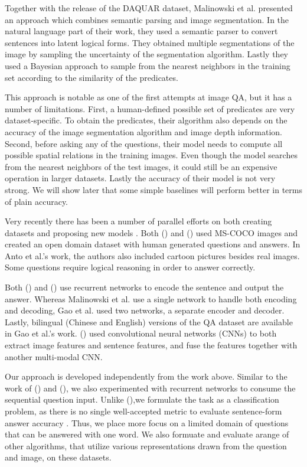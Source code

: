 \documentclass{article}
\renewcommand{\*}[1]{\textbf{#1}}
\newcommand{\shortcite}[1]{\citeauthor{#1} (\citeyear{#1})}
\begin{document}
Together with the release of the DAQUAR dataset, Malinowski et al. presented 
an approach which combines semantic parsing and image segmentation. In the 
natural language part of their work, they used a semantic parser \cite{liang13} 
to convert sentences into latent logical forms. They obtained multiple 
segmentations of the image by sampling the uncertainty of the segmentation 
algorithm. Lastly they used a Bayesian approach to sample from the nearest 
neighbors in the training set according to the similarity of the predicates.

This approach is notable as one of the first attempts at image QA, but it has a 
number of limitations. First, a human-defined possible set of predicates are 
very dataset-specific. To obtain the predicates, their algorithm also depends 
on the accuracy of the image segmentation algorithm and image depth 
information. Second, before asking any of the questions, their model needs to 
compute all possible spatial relations in the training images. Even though the 
model searches from the nearest neighbors of the test images, it could still be 
an expensive operation in larger datasets. Lastly the accuracy of their model 
is not very strong. We will show later that some simple baselines will perform 
better in terms of plain accuracy.

Very recently there has been a number of parallel efforts on both 
creating datasets and proposing new models \cite{antol14, mal15, gao15, ma15}. 
Both \shortcite{antol14} and \shortcite{gao15} used MS-COCO \cite{mscoco} 
images and created an open domain dataset with human generated questions and 
answers. In Anto et al.'s work, the authors also included cartoon pictures 
besides real images. Some questions require logical reasoning in order to 
answer correctly.

Both \shortcite{mal15} and \shortcite{gao15} use recurrent networks to encode 
the sentence and output the answer. Whereas Malinowski et al. use a single 
network to handle both encoding and decoding, Gao et al. used two networks, a 
separate encoder and decoder. Lastly, bilingual (Chinese and English) versions 
of the QA dataset are available in Gao et al.'s work. \shortcite{ma15} used 
convolutional neural networks (CNNs) to both extract image features and 
sentence features, and fuse the features together with another multi-modal CNN. 

Our approach is developed independently from the work above. Similar to the 
work of \shortcite{mal15} and \shortcite{gao15}, we also experimented with 
recurrent networks to consume the sequential question input. Unlike 
\shortcite{gao15},we formulate the task as a classification problem, as there 
is no single well-accepted metric to evaluate sentence-form answer accuracy 
\cite{chen15}. Thus, we place more focus on a limited domain of questions that 
can be answered with one word. We also formuate and evaluate arange of other 
algorithms, that utilize various representations drawn from the question and 
image, on these datasets.
\end{document}
